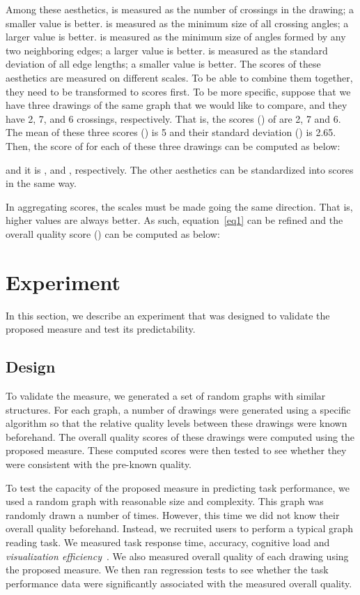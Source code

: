 \documentclass[conference,letterpaper]{IEEEtran}
\begin{document}
Among these aesthetics,  is measured as the number of crossings in the drawing; a smaller value is better.  is measured as the minimum size of all crossing angles; a larger value is better.  is measured as the minimum size of angles formed by any two neighboring edges; a larger value is better.  is measured as the standard deviation of all edge lengths; a smaller value is better. The scores of these aesthetics are measured on different scales. To be able to combine them together, they need to be transformed to  scores first. To be more specific, suppose that we have three drawings of the same graph that we would like to compare, and they have 2, 7, and 6 crossings, respectively. That is, the scores () of  are 2, 7 and 6. The mean of these three scores () is 5 and their standard deviation () is 2.65. Then, the  score of  for each of these three drawings can be computed as below:




\noindent and it is ,  and , respectively. The other aesthetics can be standardized into  scores in the same way.

In aggregating  scores, the scales must be made going the same direction. That is, higher values are always better. As such, equation~\ref{eq1} can be refined and the overall quality score () can be computed as below:




\section{Experiment} \label{sec:experiment}

In this section, we describe an experiment that was designed to validate the proposed measure and test its predictability.


\subsection{Design}
To validate the measure, we generated a set of random graphs with similar structures. For each graph, a number of drawings were generated using a specific algorithm so that the relative quality levels between these drawings were known beforehand. The overall quality scores of these drawings were computed using the proposed measure. These computed scores were then tested to see whether they were consistent with the pre-known quality. 

To test the capacity of the proposed measure in predicting task performance, we used a random graph with reasonable size and complexity. This graph was randomly drawn a number of times. However, this time we did not know their overall quality beforehand. Instead, we recruited users to perform a typical graph reading task. We measured task response time, accuracy, cognitive load and \emph{visualization efficiency}~\cite{huang09}. We also measured overall quality of each drawing using the proposed measure. We then ran regression tests to see whether the task performance data were significantly associated with the measured overall quality.
\end{document}
